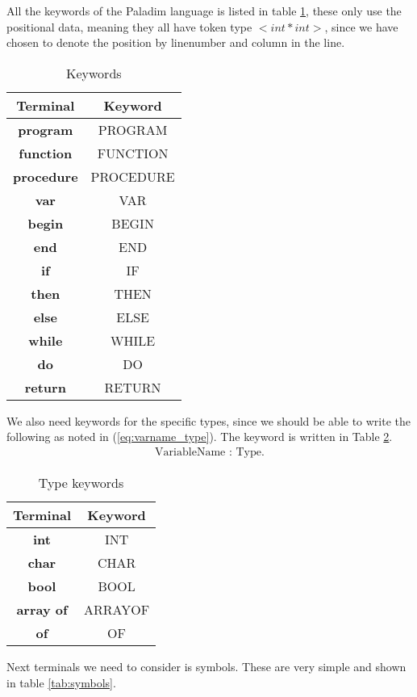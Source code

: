 \documentclass[10pt]{article}
\begin{document}
All the keywords of the Paladim language is listed in table \ref{tab:keywords}, these only use the positional data, meaning they all have token type $<int*int>$, since we have chosen to denote the position by linenumber and column in the line.

\begin{table}[h!]
\centering
\begin{tabular}{|c|c|}
Terminal & Keyword \\
\hline
\textbf{program} & PROGRAM \\
\textbf{function} & FUNCTION \\
\textbf{procedure} & PROCEDURE \\
\textbf{var} & VAR \\
\textbf{begin} & BEGIN \\
\textbf{end} & END \\
\textbf{if} & IF \\
\textbf{then} & THEN \\
\textbf{else} & ELSE \\
\textbf{while} & WHILE \\
\textbf{do} & DO \\
\textbf{return} & RETURN \\
\hline
\end{tabular}
\caption{\label{tab:keywords}Keywords}
\end{table}

We also need keywords for the specific types, since we should be able to write the following as noted in (\ref{eq:varname_type}). The keyword is written in Table \ref{tab:type_keywords}.
\begin{align}
\label{eq:varname_type}
\text{VariableName} \textbf{ : } \text{Type}. 
\end{align}

\begin{table}[h!]
\centering
\begin{tabular}{|c|c|}
Terminal & Keyword \\
\hline
\textbf{int} & INT \\
\textbf{char} & CHAR \\
\textbf{bool} & BOOL \\
\textbf{array of} & ARRAYOF \\
\textbf{of} & OF \\
\hline
\end{tabular}
\caption{\label{tab:type_keywords}Type keywords}
\end{table}

Next terminals we need to consider is symbols. These are very simple and shown in table \ref{tab:symbols}.
\end{document}
